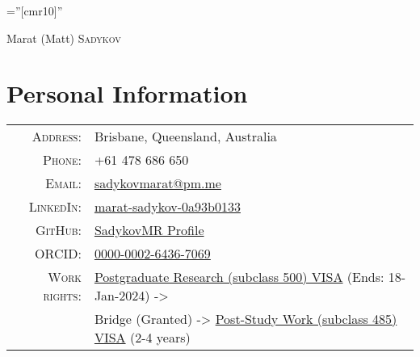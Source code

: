 \documentclass[a4paper,12pt]{article}
\begin{document}

\pagestyle{empty} %

\font\fb=''[cmr10]'' %

\par{\centering
		{\Huge Marat (Matt) \textsc{Sadykov}
	}\bigskip\par}

\section{Personal Information}

\begin{tabular}{rl}
    \textsc{Address:}   & Brisbane, Queensland, Australia\\
    \textsc{Phone:}     & +61 478 686 650\\
    \textsc{Email:}     & \href{mailto:sadykovmarat@pm.me}{sadykovmarat@pm.me} \\
    \textsc{LinkedIn:}  & \href{https://www.linkedin.com/in/marat-sadykov-0a93b0133/}{marat-sadykov-0a93b0133} \\
    \textsc{GitHub:}    & \href{https://github.com/SmugglerSMR}{SadykovMR Profile} \\
    \textsc{ORCID:}    & \href{https://orcid.org/0000-0002-6436-7069}{0000-0002-6436-7069} \\
    \textsc{Work rights:} & \href{https://immi.homeaffairs.gov.au/visas/getting-a-visa/visa-listing/student-500}{Postgraduate Research (subclass 500) VISA} (Ends: 18-Jan-2024) -> \\
    & Bridge (Granted) -> \href{https://immi.homeaffairs.gov.au/visas/getting-a-visa/visa-listing/temporary-graduate-485/post-study-work}{Post-Study Work (subclass 485) VISA} (2-4 years)
\end{tabular}
\end{document}
